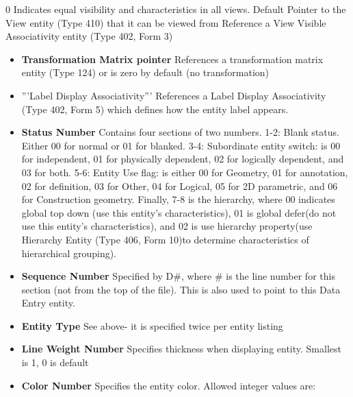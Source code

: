0 Indicates equal visibility and characteristics in all views. Default
Pointer to the View entity (Type 410) that it can be viewed from
Reference a View Visible Associativity entity (Type 402, Form 3)

\begin{itemize}
\itemsep1pt\parskip0pt
\item
  \textbf{Transformation Matrix pointer} References a transformation
  matrix entity (Type 124) or is zero by default (no transformation)
\item
  '''Label Display Associativity''' References a Label Display
  Associativity (Type 402, Form 5) which defines how the entity label
  appears.
\item
  \textbf{Status Number} Contains four sections of two numbers. 1-2:
  Blank status. Either 00 for normal or 01 for blanked. 3-4: Subordinate
  entity switch: is 00 for independent, 01 for physically dependent, 02
  for logically dependent, and 03 for both. 5-6: Entity Use flag: is
  either 00 for Geometry, 01 for annotation, 02 for definition, 03 for
  Other, 04 for Logical, 05 for 2D parametric, and 06 for Construction
  geometry. Finally, 7-8 is the hierarchy, where 00 indicates global top
  down (use this entity's characteristics), 01 is global defer(do not
  use this entity's characteristics), and 02 is use hierarchy
  property(use Hierarchy Entity (Type 406, Form 10)to determine
  characteristics of hierarchical grouping).
\item
  \textbf{Sequence Number} Specified by D\#, where \# is the line number
  for this section (not from the top of the file). This is also used to
  point to this Data Entry entity.
\item
  \textbf{Entity Type} See above- it is specified twice per entity
  listing
\item
  \textbf{Line Weight Number} Specifies thickness when displaying
  entity. Smallest is 1, 0 is default
\item
  \textbf{Color Number} Specifies the entity color. Allowed integer
  values are:


\end{itemize}
